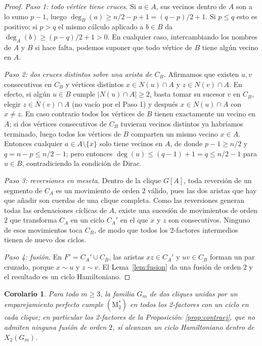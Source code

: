 \documentclass[11pt,a4paper]{article}
\newtheorem{corolario}[teorema]{Corolario}
\theoremstyle{definition}
\theoremstyle{remark}
\begin{document}
\begin{proof}
\emph{Paso 1: todo vértice tiene cruces.} Si $a\in A$, sus vecinos dentro de $A$ son a lo sumo $p-1$, luego $\deg_B(a)\ge n/2-p+1=(q-p)/2+1$. Si $p\le q$ esto es positivo; si $p>q$ el mismo cálculo aplicado a $b\in B$ da $\deg_A(b)\ge(p-q)/2+1>0$. En cualquier caso, intercambiando los nombres de $A$ y $B$ si hace falta, podemos suponer que todo vértice de $B$ tiene algún vecino en $A$.

\emph{Paso 2: dos cruces distintos sobre una arista de $C_B$.} Afirmamos que existen $u,v$ consecutivos en $C_B$ y vértices distintos $x\in N(u)\cap A$ y $z\in N(v)\cap A$. En efecto, si algún $u\in B$ cumple $|N(u)\cap A|\ge2$, basta tomar su sucesor $v$ en $C_B$, elegir $z\in N(v)\cap A$ (no vacío por el Paso 1) y después $x\in N(u)\cap A$ con $x\neq z$. En caso contrario todos los vértices de $B$ tienen exactamente un vecino en $A$; si dos vértices consecutivos de $C_B$ tuvieran vecinos distintos ya habríamos terminado, luego todos los vértices de $B$ comparten un mismo vecino $x\in A$. Entonces cualquier $a\in A\setminus\{x\}$ solo tiene vecinos en $A$, de donde $p-1\ge n/2$ y $q=n-p\le n/2-1$; pero entonces $\deg(u)\le(q-1)+1=q\le n/2-1$ para $u\in B$, contradiciendo la condición de Dirac. 

\emph{Paso 3: reversiones en meseta.} Dentro de la clique $G[A]$, toda reversión de un segmento de $C_A$ es un movimiento de orden $2$ válido, pues las dos aristas que hay que añadir son cuerdas de una clique completa. Como las reversiones generan todas las ordenaciones cíclicas de $A$, existe una sucesión de movimientos de orden $2$ que transforma $C_A$ en un ciclo $C_A'$ en el que $x$ y $z$ son consecutivos. Ninguno de esos movimientos toca $C_B$, de modo que todos los 2-factores intermedios tienen de nuevo dos ciclos.

\emph{Paso 4: fusión.} En $F'=C_A'\cup C_B$, las aristas $xz\in C_A'$ y $uv\in C_B$ forman un par cruzado, porque $x\sim u$ y $z\sim v$. El Lema~\ref{lem:fusion} da una fusión de orden $2$ y el resultado es un ciclo Hamiltoniano.
\end{proof}

\begin{corolario}\label{cor:Gm}
Para todo $m\ge3$, la familia $G_m$ de dos cliques unidas por un emparejamiento perfecto cumple $(\mathrm{M}^*_2)$ en todos los 2-factores con un ciclo en cada clique; en particular los 2-factores de la Proposición~\ref{prop:contraej}, que no admiten ninguna fusión de orden $2$, sí alcanzan un ciclo Hamiltoniano dentro de $X_2(G_m)$.
\end{corolario}
\end{document}
